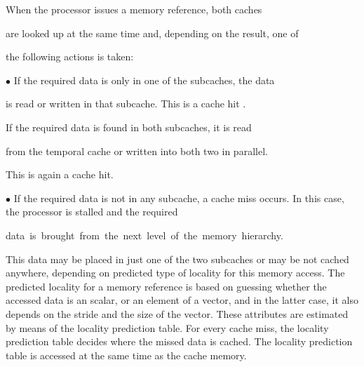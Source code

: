 \documentclass[12pt]{article}
\begin{document}
\setlength{\parskip}{0.0pt}
{\fontsize{10pt}{12.0pt}\selectfont When the processor issues a memory reference, both caches\par}\par

{\fontsize{10pt}{12.0pt}\selectfont are looked up at the same time and, depending on the result, one of\par}\par

{\fontsize{10pt}{12.0pt}\selectfont the following actions is taken:\par}\par

{\fontsize{10pt}{12.0pt}\selectfont $\bullet$  If the required data is only in one of the subcaches, the data\par}\par

\setlength{\parskip}{8.04pt}
\begin{adjustwidth}{0.25in}{0.0in}
{\fontsize{10pt}{12.0pt}\selectfont is read or written in that subcache. This is a cache hit .\par}\par

\end{adjustwidth}

\setlength{\parskip}{0.0pt}
{\fontsize{10pt}{12.0pt}\selectfont If the required data is found in both subcaches, it is read\par}\par

{\fontsize{10pt}{12.0pt}\selectfont from the temporal cache or written into both two in parallel. \par}\par

{\fontsize{10pt}{12.0pt}\selectfont This is again a cache hit.\par}\par

{\fontsize{10pt}{12.0pt}\selectfont $\bullet$  If the required data is not in any subcache, a cache miss occurs. In this case, the processor is stalled and the required\par}\par

{\fontsize{10pt}{12.0pt}\selectfont data\ is\ brought\ from\ the\ next\ level\ of\ the\ memory\ hierarchy.\ \ \ \ \ \ \ \ \ \ \            \par}\par

{\fontsize{10pt}{12.0pt}\selectfont This data may be placed in just one of the two subcaches or may be not cached anywhere, depending on predicted type of locality for this memory access. The predicted locality for a memory reference is based on guessing whether the accessed data is an scalar, or an element of a vector, and in the latter case, it also depends on the stride and the size of the vector. These attributes are estimated by means of the locality prediction table. For every cache miss, the locality prediction table decides where the missed data is cached. The locality prediction table is accessed at the same time as the cache memory.\par}\par
\end{document}
